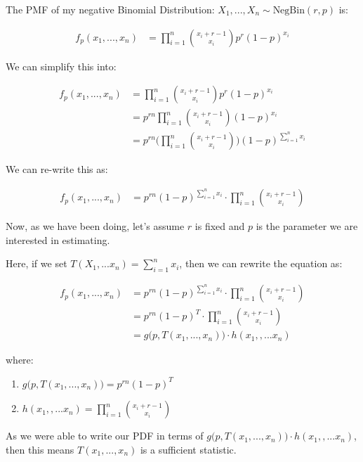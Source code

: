 \documentclass[
  letterpaper,
  DIV=11,
  numbers=noendperiod]{scrreprt}
\begin{document}
The PMF of my negative Binomial Distribution:
\(X_1,...,X_n \sim \text{NegBin}(r, p)\) is:

\[
\begin{aligned}
    f_p(x_1,...,x_n) &= \prod_{i=1}^n \binom{x_i + r- 1}{x_i} p^r (1 - p)^{x_i}
\end{aligned}
\]

We can simplify this into:

\[
\begin{aligned}
    f_p(x_1,...,x_n) &= \prod_{i=1}^n \binom{x_i + r- 1}{x_i} p^r (1 - p)^{x_i} \\
     &= p^{rn} \prod_{i=1}^n \binom{x_i + r- 1}{x_i} (1 - p)^{x_i} \\
    &= p^{rn} \Bigg( \prod_{i=1}^n \binom{x_i + r- 1}{x_i} \Bigg) (1 - p)^{\sum_{i=1}^nx_i} 
\end{aligned}
\]

We can re-write this as:

\[
\begin{aligned}
 f_p(x_1,...,x_n) &= p^{rn}(1 - p)^{\sum_{i=1}^n x_i} \cdot  \prod_{i=1}^n \binom{x_i + r- 1}{x_i} 
\end{aligned}
\]

Now, as we have been doing, let's assume \(r\) is fixed and \(p\) is the
parameter we are interested in estimating.

Here, if we set \(T(X_1,...x_n) = \sum_{i=1}^n x_i\), then we can
rewrite the equation as:

\[
\begin{aligned}
 f_p(x_1,...,x_n) &= p^{rn}(1 - p)^{\sum_{i=1}^n x_i} \cdot  \prod_{i=1}^n \binom{x_i + r- 1}{x_i} \\
&= p^{rn}(1 - p)^{T} \cdot  \prod_{i=1}^n \binom{x_i + r- 1}{x_i} \\
&= g\Big( p, T(x_1,...,x_n)\Big)  \cdot  h(x_1,,...x_n)
\end{aligned}
\]

where:

\begin{enumerate}
\def\labelenumi{\arabic{enumi}.}
\item
  \(g\Big( p, T(x_1,...,x_n)\Big) = p^{rn}(1 - p)^{T}\)
\item
  \(h(x_1,,...x_n) = \prod_{i=1}^n \binom{x_i + r- 1}{x_i}\)
\end{enumerate}

As we were able to write our PDF in terms of
\(g\Big(p, T(x_1,...,x_n)\Big)  \cdot  h(x_1,,...x_n)\), then this means
\(T(x_1,...,x_n)\) is a sufficient statistic.
\end{document}
